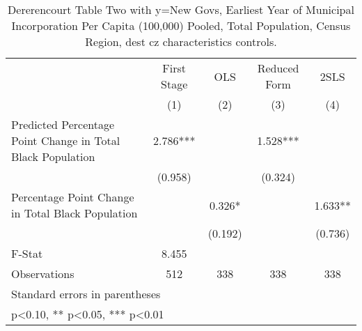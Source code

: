 \begin{table}[htbp]\centering
\def\sym#1{\ifmmode^{#1}\else\(^{#1}\)\fi}
\caption{Dererencourt Table Two with y=New Govs, Earliest Year of Municipal Incorporation Per Capita (100,000) Pooled, Total Population, Census Region, dest cz characteristics controls.}
\begin{tabular}{l*{4}{c}}
\toprule
                    & First Stage   &         OLS   &Reduced Form   &        2SLS   \\
                    &\multicolumn{1}{c}{(1)}   &\multicolumn{1}{c}{(2)}   &\multicolumn{1}{c}{(3)}   &\multicolumn{1}{c}{(4)}   \\
\midrule
Predicted Percentage Point Change in Total Black Population&       2.786***&               &       1.528***&               \\
                    &     (0.958)   &               &     (0.324)   &               \\
\addlinespace
Percentage Point Change in Total Black Population&               &       0.326*  &               &       1.633** \\
                    &               &     (0.192)   &               &     (0.736)   \\
\midrule
F-Stat              &       8.455   &               &               &               \\
Observations        &         512   &         338   &         338   &         338   \\
\bottomrule
\multicolumn{5}{l}{\footnotesize Standard errors in parentheses}\\
\multicolumn{5}{l}{\footnotesize * p<0.10, ** p<0.05, *** p<0.01}\\
\end{tabular}
\end{table}
